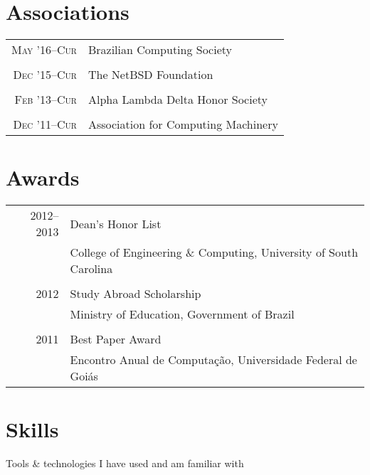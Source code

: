 \documentclass[a4paper,10pt]{article}
\begin{document}
\section{Associations}

\begin{tabular}{r|p{11cm}}

  \textsc{May '16--Cur}
  & Brazilian Computing Society\\
  \multicolumn{2}{c}{}\\

  \textsc{Dec '15--Cur}
  & The NetBSD Foundation
  \\\multicolumn{2}{c}{}\\

  \textsc{Feb '13--Cur}
  & Alpha Lambda Delta Honor Society\\
  \multicolumn{2}{c}{}\\

  \textsc{Dec '11--Cur}
  & Association for Computing Machinery\\

\end{tabular}

\section{Awards}
\begin{tabular}{r|p{11cm}}

  \textsc{2012--2013}
  & Dean's Honor List\\
  & College of Engineering \& Computing, University of South Carolina\\
  \multicolumn{2}{c}{}\\

  \textsc{2012}
  & Study Abroad Scholarship\\
  & Ministry of Education, Government of Brazil\\
  \multicolumn{2}{c}{}\\

  \textsc{2011}
  & Best Paper Award\\
  & Encontro Anual de Computação, Universidade Federal de Goiás\\

\end{tabular}

\section{Skills}

Tools \& technologies I have used and am familiar with
\end{document}
